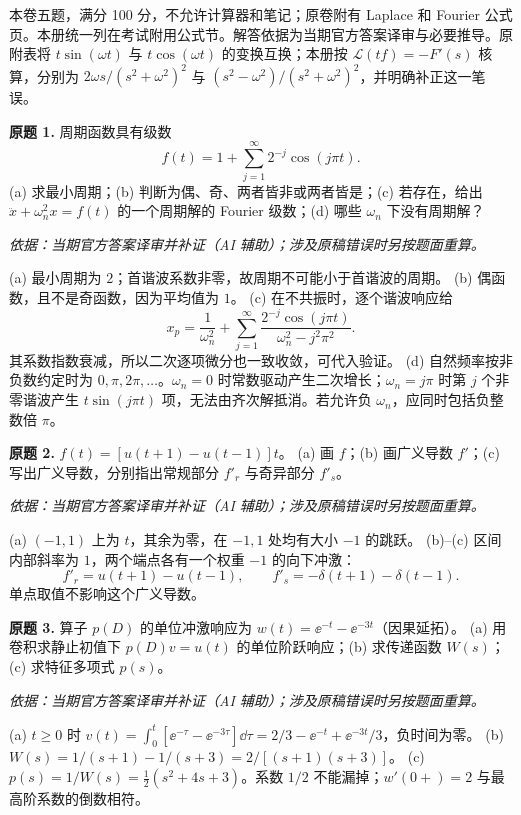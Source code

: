本卷五题，满分 100 分，不允许计算器和笔记；原卷附有 Laplace 和 Fourier 公式页。本册统一列在考试附用公式节。解答依据为当期官方答案译审与必要推导。原附表将 $t\sin(\omega t)$ 与 $t\cos(\omega t)$ 的变换互换；本册按 $\mathcal L(tf)=-F'(s)$ 核算，分别为 $2\omega s/(s^2+\omega^2)^2$ 与 $(s^2-\omega^2)/(s^2+\omega^2)^2$，并明确补正这一笔误。
\begin{exercise}\label{cw:ex3-1}\textbf{原题 1.} 周期函数具有级数
\[f(t)=1+\sum_{j=1}^\infty 2^{-j}\cos(j\pi t).\]
(a) 求最小周期；(b) 判断为偶、奇、两者皆非或两者皆是；(c) 若存在，给出 $\ddot x+\omega_n^2x=f(t)$ 的一个周期解的 Fourier 级数；(d) 哪些 $\omega_n$ 下没有周期解？
\end{exercise}
\begin{solution}
\textit{依据：当期官方答案译审并补证（AI 辅助）；涉及原稿错误时另按题面重算。}\par
(a) 最小周期为 $2$；首谐波系数非零，故周期不可能小于首谐波的周期。
(b) 偶函数，且不是奇函数，因为平均值为 $1$。
(c) 在不共振时，逐个谐波响应给
\[x_p=\frac1{\omega_n^2}+\sum_{j=1}^\infty\frac{2^{-j}\cos(j\pi t)}{\omega_n^2-j^2\pi^2}.\]
其系数指数衰减，所以二次逐项微分也一致收敛，可代入验证。
(d) 自然频率按非负数约定时为 $0,\pi,2\pi,\ldots$。$\omega_n=0$ 时常数驱动产生二次增长；$\omega_n=j\pi$ 时第 $j$ 个非零谐波产生 $t\sin(j\pi t)$ 项，无法由齐次解抵消。若允许负 $\omega_n$，应同时包括负整数倍 $\pi$。
\end{solution}
\begin{exercise}\label{cw:ex3-2}\textbf{原题 2.} $f(t)=[u(t+1)-u(t-1)]t$。
(a) 画 $f$；(b) 画广义导数 $f'$；(c) 写出广义导数，分别指出常规部分 $f'_r$ 与奇异部分 $f'_s$。
\end{exercise}
\begin{solution}
\textit{依据：当期官方答案译审并补证（AI 辅助）；涉及原稿错误时另按题面重算。}\par
(a) $(-1,1)$ 上为 $t$，其余为零，在 $-1,1$ 处均有大小 $-1$ 的跳跃。
(b)--(c) 区间内部斜率为 $1$，两个端点各有一个权重 $-1$ 的向下冲激：
\[f'_r=u(t+1)-u(t-1),\qquad f'_s=-\delta(t+1)-\delta(t-1).\]
单点取值不影响这个广义导数。
\ODEExamRampDerivative
\end{solution}
\begin{exercise}\label{cw:ex3-3}\textbf{原题 3.} 算子 $p(D)$ 的单位冲激响应为 $w(t)=\ee^{-t}-\ee^{-3t}$（因果延拓）。
(a) 用卷积求静止初值下 $p(D)v=u(t)$ 的单位阶跃响应；(b) 求传递函数 $W(s)$；(c) 求特征多项式 $p(s)$。
\end{exercise}
\begin{solution}
\textit{依据：当期官方答案译审并补证（AI 辅助）；涉及原稿错误时另按题面重算。}\par
(a) $t\ge0$ 时 $v(t)=\int_0^t[\ee^{-\tau}-\ee^{-3\tau}]\dd\tau=2/3-\ee^{-t}+\ee^{-3t}/3$，负时间为零。
(b) $W(s)=1/(s+1)-1/(s+3)=2/[(s+1)(s+3)]$。
(c) $p(s)=1/W(s)=\tfrac12(s^2+4s+3)$。系数 $1/2$ 不能漏掉；$w'(0+)=2$ 与最高阶系数的倒数相符。
\end{solution}
